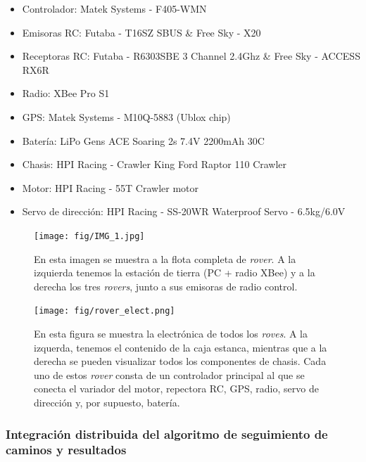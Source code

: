 \begin{itemize}
    \item Controlador: Matek Systems - F405-WMN
    \item Emisoras RC: Futaba - T16SZ SBUS \& Free Sky - X20
    \item Receptoras RC: Futaba - R6303SBE 3 Channel 2.4Ghz \& Free Sky - ACCESS RX6R
    \item Radio: XBee Pro S1
    \item GPS: Matek Systems - M10Q-5883 (Ublox chip) 
    \item Batería: LiPo Gens ACE Soaring 2s 7.4V 2200mAh 30C
    \item Chasis: HPI Racing - Crawler King Ford Raptor 110 Crawler
    \item Motor: HPI Racing - 55T Crawler motor
    \item Servo de dirección: HPI Racing - SS-20WR Waterproof Servo - 6.5kg/6.0V
    
\end{itemize}

\vspace{2cm}

\begin{figure}[h!]
    \centering
    \texttt{[image: fig/IMG\_1.jpg]}
    \caption{En esta imagen se muestra a la flota completa de \textit{rover}. A la izquierda tenemos la estación de tierra (PC + radio XBee) y a la derecha los tres \textit{rovers}, junto a sus emisoras de radio control.}
    \label{fig: rover_fleet}
\end{figure}

\newpage

\begin{figure}[h!]
    \centering
    \texttt{[image: fig/rover\_elect.png]}
    \caption{En esta figura se muestra la electrónica de todos los \textit{roves}. A la izquerda, tenemos el contenido de la caja estanca, mientras que a la derecha se pueden visualizar todos los componentes de chasis. Cada uno de estos \textit{rover} consta de un controlador principal al que se conecta el variador del motor, repectora RC, GPS, radio, servo de dirección y, por supuesto, batería.}
    \label{fig: rover_elct}
\end{figure}

\subsubsection{Integración distribuida del algoritmo de seguimiento de caminos y resultados}

